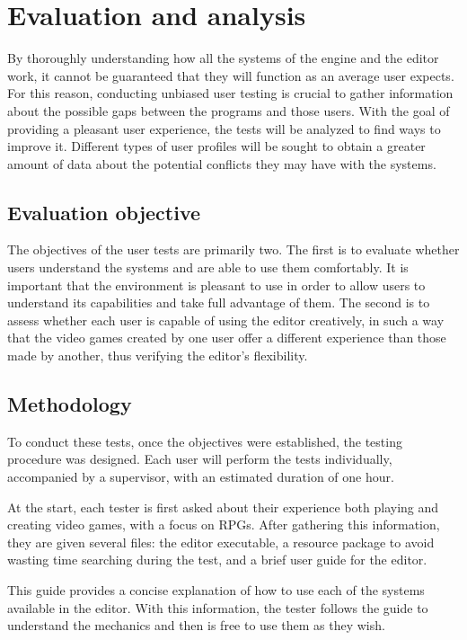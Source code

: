 \chapter*{Evaluation and analysis}
\label{cap:conclusions}

By thoroughly understanding how all the systems of the engine and the editor work, it cannot be guaranteed that they will function as an average user expects. For this reason, conducting unbiased user testing is crucial to gather information about the possible gaps between the programs and those users. With the goal of providing a pleasant user experience, the tests will be analyzed to find ways to improve it. Different types of user profiles will be sought to obtain a greater amount of data about the potential conflicts they may have with the systems.

\section*{Evaluation objective}
The objectives of the user tests are primarily two. The first is to evaluate whether users understand the systems and are able to use them comfortably. It is important that the environment is pleasant to use in order to allow users to understand its capabilities and take full advantage of them. The second is to assess whether each user is capable of using the editor creatively, in such a way that the video games created by one user offer a different experience than those made by another, thus verifying the editor’s flexibility.

\section*{Methodology}
To conduct these tests, once the objectives were established, the testing procedure was designed. Each user will perform the tests individually, accompanied by a supervisor, with an estimated duration of one hour.

\smallskip

At the start, each tester is first asked about their experience both playing and creating video games, with a focus on RPGs. After gathering this information, they are given several files: the editor executable, a resource package to avoid wasting time searching during the test, and a brief user guide for the editor.

\smallskip

This guide provides a concise explanation of how to use each of the systems available in the editor. With this information, the tester follows the guide to understand the mechanics and then is free to use them as they wish.

